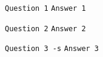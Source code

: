 


\texttt{Question 1}
\texttt{Answer 1}



\texttt{Question 2}
\texttt{Answer 2}



\texttt{Question 3 -s}
\texttt{Answer 3}



